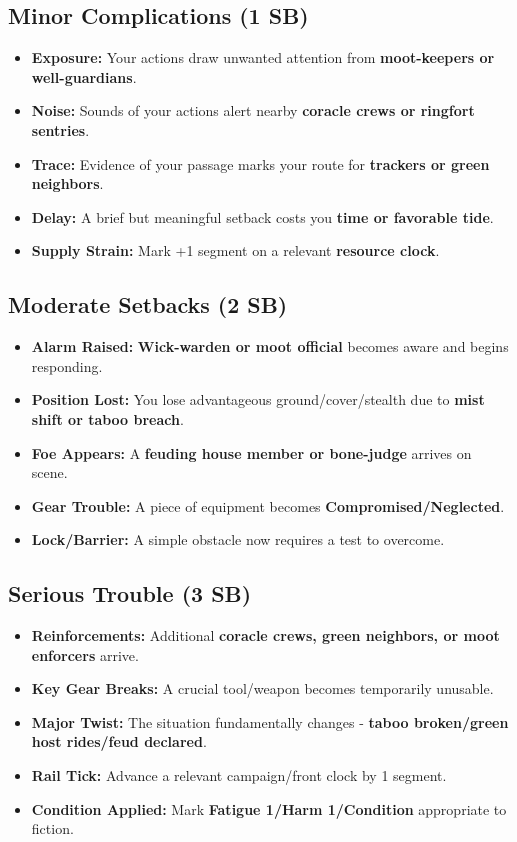 \subsection*{Minor Complications (1 SB)}
\begin{itemize}
\item \textbf{Exposure:} Your actions draw unwanted attention from \textbf{moot-keepers or well-guardians}.
\item \textbf{Noise:} Sounds of your actions alert nearby \textbf{coracle crews or ringfort sentries}.
\item \textbf{Trace:} Evidence of your passage marks your route for \textbf{trackers or green neighbors}.
\item \textbf{Delay:} A brief but meaningful setback costs you \textbf{time or favorable tide}.
\item \textbf{Supply Strain:} Mark +1 segment on a relevant \textbf{resource clock}.
\end{itemize}

\subsection*{Moderate Setbacks (2 SB)}
\begin{itemize}
\item \textbf{Alarm Raised:} \textbf{Wick-warden or moot official} becomes aware and begins responding.
\item \textbf{Position Lost:} You lose advantageous ground/cover/stealth due to \textbf{mist shift or taboo breach}.
\item \textbf{Foe Appears:} A \textbf{feuding house member or bone-judge} arrives on scene.
\item \textbf{Gear Trouble:} A piece of equipment becomes \textbf{Compromised/Neglected}.
\item \textbf{Lock/Barrier:} A simple obstacle now requires a test to overcome.
\end{itemize}

\subsection*{Serious Trouble (3 SB)}
\begin{itemize}
\item \textbf{Reinforcements:} Additional \textbf{coracle crews, green neighbors, or moot enforcers} arrive.
\item \textbf{Key Gear Breaks:} A crucial tool/weapon becomes temporarily unusable.
\item \textbf{Major Twist:} The situation fundamentally changes - \textbf{taboo broken/green host rides/feud declared}.
\item \textbf{Rail Tick:} Advance a relevant campaign/front clock by 1 segment.
\item \textbf{Condition Applied:} Mark \textbf{Fatigue 1/Harm 1/Condition} appropriate to fiction.
\end{itemize}

